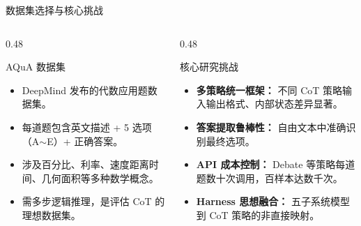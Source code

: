 \documentclass[10pt,aspectratio=169]{beamer}
\newcommand{\tightitems}{\setlength{\itemsep}{0.24em}}
\begin{document}
\begin{frame}{数据集选择与核心挑战}
  \begin{columns}[T,onlytextwidth]
    \begin{column}{0.48\textwidth}
      \begin{block}{AQuA 数据集}
        \begin{itemize}
          \tightitems
          \item DeepMind 发布的代数应用题数据集。
          \item 每道题包含英文描述 + 5 选项（A$\sim$E）+ 正确答案。
          \item 涉及百分比、利率、速度距离时间、几何面积等多种数学概念。
          \item 需多步逻辑推理，是评估 CoT 的理想数据集。
        \end{itemize}
      \end{block}
    \end{column}
    \begin{column}{0.48\textwidth}
      \begin{block}{核心研究挑战}
        \begin{itemize}
          \tightitems
          \item \textbf{多策略统一框架：} 不同 CoT 策略输入输出格式、内部状态差异显著。
          \item \textbf{答案提取鲁棒性：} 自由文本中准确识别最终选项。
          \item \textbf{API 成本控制：} Debate 等策略每道题数十次调用，百样本达数千次。
          \item \textbf{Harness 思想融合：} 五子系统模型到 CoT 策略的非直接映射。
        \end{itemize}
      \end{block}
    \end{column}
  \end{columns}
\end{frame}
\end{document}
